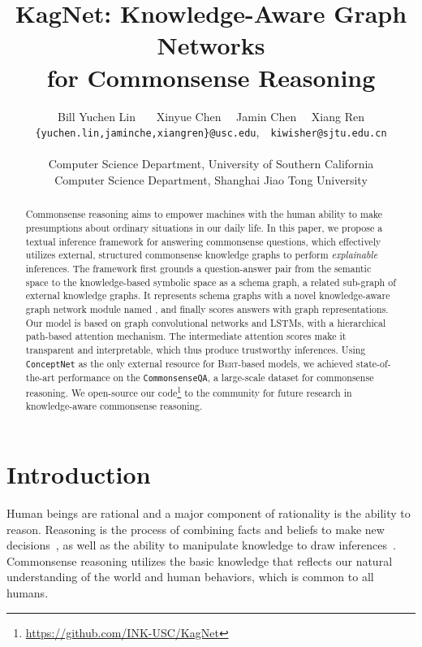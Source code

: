\documentclass[11pt,a4paper]{article}
\title{KagNet: Knowledge-Aware Graph Networks\\ for Commonsense Reasoning}
\author{
Bill Yuchen Lin\textsuperscript{\dag}~~~
Xinyue Chen\textsuperscript{\ddag}~~
Jamin Chen\textsuperscript{\dag}~~
Xiang Ren\textsuperscript{\dag}\\
\texttt{\{yuchen.lin,jaminche,xiangren\}@usc.edu},~~\texttt{kiwisher@sjtu.edu.cn}
\\~\\
\textsuperscript{\dag}{Computer Science Department, University of Southern California} \\ \textsuperscript{\ddag}Computer Science Department, Shanghai Jiao Tong University
}
\date{}
\begin{document}
\maketitle
\begin{abstract}


Commonsense reasoning aims to empower machines with the human ability to make presumptions about ordinary situations in our daily life.  
In this paper, we propose a textual inference framework for answering commonsense questions, which effectively utilizes external, structured commonsense knowledge graphs to perform \textit{explainable} inferences. 
The framework first grounds a question-answer pair from the semantic space to the knowledge-based symbolic space as a schema graph, a related sub-graph of external knowledge graphs.
It represents schema graphs with a novel knowledge-aware graph network module named \KagNet, and finally scores answers with graph representations.
Our model is based on graph convolutional networks and LSTMs, with a hierarchical path-based attention mechanism.
The intermediate attention scores make it transparent and interpretable, which thus produce trustworthy inferences.
Using \texttt{ConceptNet} as the only external resource for \textsc{Bert}-based models, we achieved state-of-the-art performance on the \texttt{CommonsenseQA}, a large-scale dataset for commonsense reasoning. We open-source our code\footnote{\url{https://github.com/INK-USC/KagNet}} to the community for future research in knowledge-aware commonsense reasoning.
\end{abstract}

\section{Introduction}
Human beings are rational 
and a major component of rationality is the ability to reason.
Reasoning is the process of combining facts and beliefs to make new decisions~\cite{johnson1980mental}, as well as the ability to manipulate knowledge to draw inferences~\cite{Hudson2018CompositionalAN}.
Commonsense reasoning utilizes the basic knowledge that reflects our natural understanding of the world and human behaviors, which is common to all humans.
\end{document}
